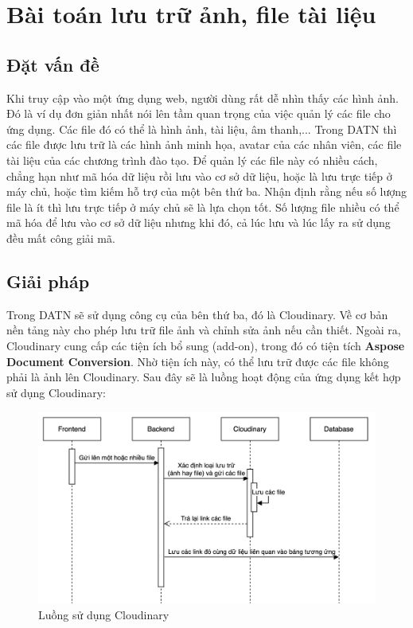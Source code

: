 \documentclass[../DoAn.tex]{subfiles}
\begin{document}
\section{Bài toán lưu trữ ảnh, file tài liệu}
\subsection{Đặt vấn đề}
Khi truy cập vào một ứng dụng web, người dùng rất dễ nhìn thấy các hình ảnh. Đó là ví dụ đơn giản nhất nói lên tầm quan trọng của việc quản lý các file cho ứng dụng. Các file đó có thể là hình ảnh, tài liệu, âm thanh,... Trong DATN thì các file được lưu trữ là các hình ảnh minh họa, avatar của các nhân viên, các file tài liệu của các chương trình đào tạo. Để quản lý các file này có nhiều cách, chẳng hạn như mã hóa dữ liệu rồi lưu vào cơ sở dữ liệu, hoặc là lưu trực tiếp ở máy chủ, hoặc tìm kiếm hỗ trợ của một bên thứ ba. Nhận định rằng nếu số lượng file là ít thì lưu trực tiếp ở máy chủ sẽ là lựa chọn tốt. Số lượng file nhiều có thể mã hóa để lưu vào cơ sở dữ liệu nhưng khi đó, cả lúc lưu và lúc lấy ra sử dụng đều mất công giải mã.

\subsection{Giải pháp}
Trong DATN sẽ sử dụng công cụ của bên thứ ba, đó là Cloudinary. Về cơ bản nền tảng này cho phép lưu trữ file ảnh và chỉnh sửa ảnh nếu cần thiết. Ngoài ra, Cloudinary cung cấp các tiện ích bổ sung (add-on), trong đó có tiện tích \textbf{Aspose Document Conversion}. Nhờ tiện ích này, có thể lưu trữ được các file không phải là ảnh lên Cloudinary. Sau đây sẽ là luồng hoạt động của ứng dụng kết hợp sử dụng Cloudinary:

\begin{figure}[H]
    \centering
    \includegraphics[width=0.9\linewidth]{Hinhve/LuongCloudinary.png}
    \caption{Luồng sử dụng Cloudinary}
\end{figure}
\end{document}

